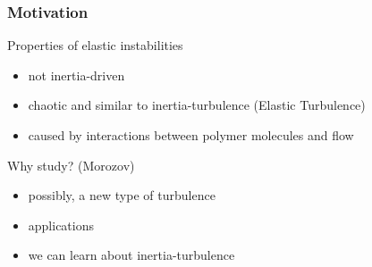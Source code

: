 \begin{frame}
  \frametitle{Motivation}
  \begin{block}{Properties of elastic instabilities}
    \begin{itemize}
    \item not inertia-driven
    \item chaotic and similar to inertia-turbulence (Elastic Turbulence)
    \item caused by interactions between polymer molecules and flow
    \end{itemize}
  \end{block}
  \begin{block}{Why study? (Morozov)}
    \begin{itemize}
    \item possibly, a new type of turbulence
    \item applications
    \item we can learn about inertia-turbulence
    \end{itemize}
  \end{block}
\end{frame}



